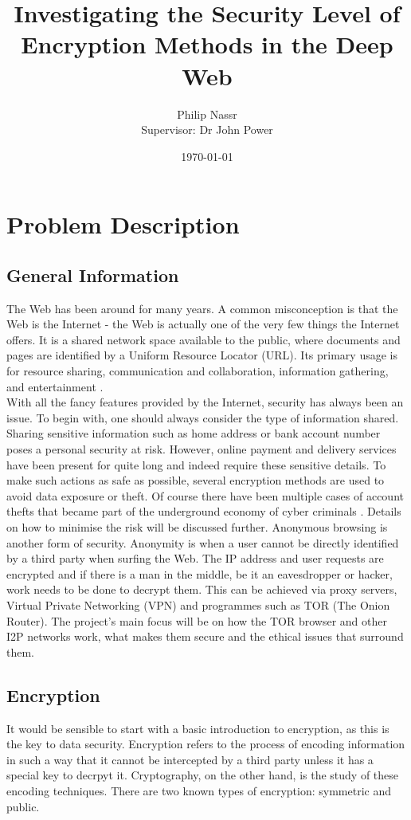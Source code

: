 \documentclass[a4paper, 12pt, titlepage]{article}
\title{\textbf{Investigating the Security Level of Encryption Methods in the Deep Web}}
\author{Philip Nassr \\[15pt] Supervisor: Dr John Power}
\date{\today}
\begin{document}
\maketitle
\tableofcontents

\section{Problem Description}

\subsection{General Information}
The Web has been around for many years. A common misconception is that the Web is the Internet - the Web is actually one of the very few things the Internet offers. It is a shared network space available to the public, where documents and pages are identified by a Uniform Resource Locator (URL). Its primary usage is for resource sharing, communication and collaboration, information gathering, and entertainment \cite{IntVsWeb}.\\[6pt]
With all the fancy features provided by the Internet, security has always been an issue. To begin with, one should always consider the type of information shared. Sharing sensitive information such as home address or bank account number poses a personal security at risk. However, online payment and delivery services have been present for quite long and indeed require these sensitive details. To make such actions as safe as possible, several encryption methods are used to avoid data exposure or theft. Of course there have been multiple cases of account thefts that became part of the underground economy of cyber criminals \cite{DWBook}. Details on how to minimise the risk will be discussed further. Anonymous browsing is another form of security. Anonymity is when a user cannot be directly identified by a third party when surfing the Web. The IP address and user requests are encrypted and if there is a man in the middle, be it an eavesdropper or hacker, work needs to be done to decrypt them. This can be achieved via proxy servers, Virtual Private Networking (VPN) and programmes such as TOR (The Onion Router). The project's main focus will be on how the TOR browser and other I2P networks work, what makes them secure and the ethical issues that surround them.

\subsection{Encryption}
It would be sensible to start with a basic introduction to encryption, as this is the key to data security. Encryption refers to the process of encoding information in such a way that it cannot be intercepted by a third party unless it has a special key to decrpyt it. Cryptography, on the other hand, is the study of these encoding techniques. There are two known types of encryption: symmetric and public.
\end{document}
